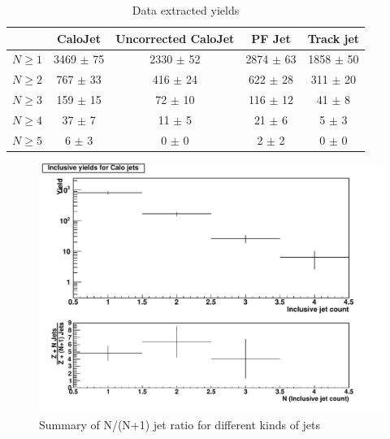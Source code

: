 \documentclass{cmspaper2}
\begin{document}
\begin{table}
\caption{Data extracted yields}
\centering
   \begin{tabular}{|c|c|c|c|c|}
      \hline
      & CaloJet & Uncorrected CaloJet & PF Jet & Track jet \\\hline
      $N \ge 1$ & 3469 $\pm$ 75 & 2330 $\pm$ 52 & 2874 $\pm$ 63 & 1858 $\pm$ 50 \\\hline
      $N \ge 2$ & 767 $\pm$ 33 & 416 $\pm$ 24 & 622 $\pm$ 28 & 311 $\pm$ 20 \\\hline
      $N \ge 3$ & 159 $\pm$ 15 & 72 $\pm$ 10 & 116 $\pm$ 12 & 41 $\pm$ 8 \\\hline
      $N \ge 4$ & 37 $\pm$ 7 & 11 $\pm$ 5 & 21 $\pm$ 6 & 5 $\pm$ 3 \\\hline
      $N \ge 5$ & 6 $\pm$ 3 & 0 $\pm$ 0 & 2 $\pm$ 2 & 0 $\pm$ 0 \\\hline
   \end{tabular}
   \label{Table_DataExtractedYields}
\end{table}

\begin{figure}[hbtp]
   \begin{center} 
  \includegraphics[width=150mm]{FinalPlot_FloatAll_Calo}
   \caption{Summary of N/(N+1) jet ratio for different kinds of jets}
   \label{Figure_RatioFromDataCaloJet}
   \end{center}
\end{figure}
\end{document}
